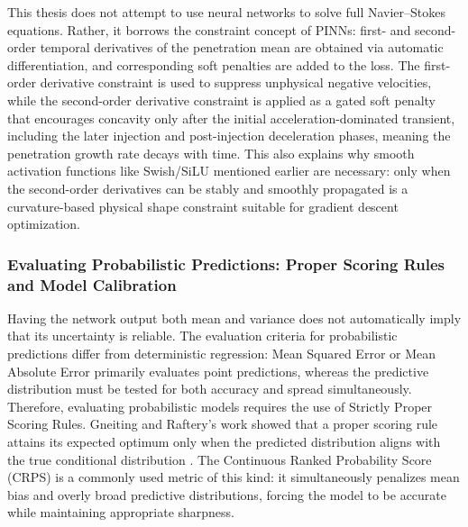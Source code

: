 This thesis does not attempt to use neural networks to solve full Navier--Stokes equations.
Rather, it borrows the constraint concept of PINNs:
first- and second-order temporal derivatives of the penetration mean are obtained via automatic differentiation, and corresponding soft penalties are added to the loss.
The first-order derivative constraint is used to suppress unphysical negative velocities, while the second-order derivative constraint is applied as a gated soft penalty that encourages concavity only after the initial acceleration-dominated transient, including the later injection and post-injection deceleration phases, meaning the penetration growth rate decays with time.
This also explains why smooth activation functions like Swish/SiLU mentioned earlier are necessary:
only when the second-order derivatives can be stably and smoothly propagated is a curvature-based physical shape constraint suitable for gradient descent optimization.

\subsubsection{Evaluating Probabilistic Predictions: Proper Scoring Rules and Model Calibration}

Having the network output both mean and variance does not automatically imply that its uncertainty is reliable.
The evaluation criteria for probabilistic predictions differ from deterministic regression:
Mean Squared Error or Mean Absolute Error primarily evaluates point predictions, whereas the predictive distribution must be tested for both accuracy and spread simultaneously.
Therefore, evaluating probabilistic models requires the use of Strictly Proper Scoring Rules.
Gneiting and Raftery's work showed that a proper scoring rule attains its expected optimum only when the predicted distribution aligns with the true conditional distribution \cite{GneitingRaftery2007CRPS}.
The Continuous Ranked Probability Score (CRPS) is a commonly used metric of this kind:
it simultaneously penalizes mean bias and overly broad predictive distributions, forcing the model to be accurate while maintaining appropriate sharpness.

